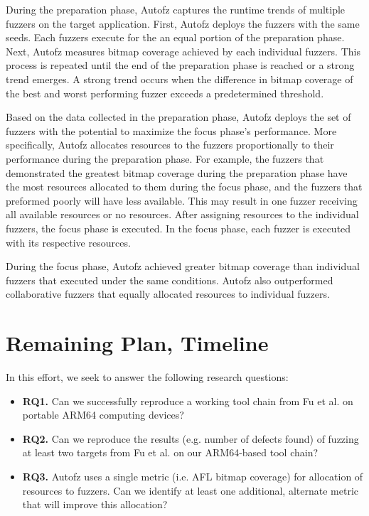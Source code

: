 During the preparation phase, Autofz captures the runtime trends of multiple fuzzers
on the target application. First, Autofz deploys the fuzzers with the same seeds.
Each fuzzers execute for the an equal portion of the preparation phase. Next, Autofz
measures bitmap coverage achieved by each individual fuzzers. This
process is repeated until the end of the preparation phase is reached or a strong trend emerges. A strong
trend occurs when the difference in bitmap coverage of the best and worst
performing fuzzer exceeds a predetermined threshold.

Based on the data collected in the preparation phase, Autofz deploys
the set of fuzzers with the potential to maximize the focus phase’s performance.
More specifically, Autofz allocates resources to the fuzzers proportionally
to their performance during the preparation phase. For example, the fuzzers
that demonstrated the greatest bitmap coverage during the preparation phase
have the most resources allocated to them during the focus phase, and the fuzzers
that preformed poorly will have less available. This may result in
one fuzzer receiving all available resources or no resources. After
assigning resources to the individual fuzzers, the focus phase is executed. In
the focus phase, each fuzzer is executed with its respective resources.

During the focus phase, Autofz achieved greater bitmap coverage than individual
fuzzers that executed under the same conditions. Autofz also outperformed
collaborative fuzzers that equally allocated resources to individual fuzzers.
\cite{Fu}

\section{Remaining Plan, Timeline}
In this effort, we seek to answer the following research questions:

\begin{itemize}
    \item \textbf{RQ1.} Can we successfully reproduce a working tool chain from
    Fu et al. \cite{Fu} on portable ARM64 computing devices?
    \item \textbf{RQ2.} Can we reproduce the results (e.g. number of defects found)
     of fuzzing at least two targets from Fu et al. \cite{Fu} on our ARM64-based
      tool chain?
    \item \textbf{RQ3.} Autofz uses a single metric (i.e. AFL bitmap coverage) for
     allocation of resources to fuzzers. Can we identify at least one additional,
     alternate metric that will improve this allocation?
\end{itemize}

